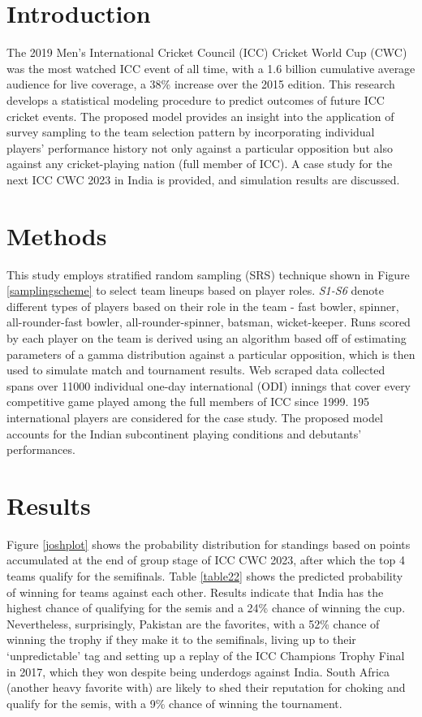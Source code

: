 \documentclass[paper=a4, 12pt, twoside]{article}
\begin{document}
	\section*{Introduction}\label{intro}
		The 2019 Men’s International Cricket Council (ICC) Cricket World Cup (CWC) was the most watched ICC event of all time, with a 1.6 billion cumulative average audience for
		live coverage, a 38\% increase over the 2015 edition. This research develops a statistical
		modeling procedure to predict outcomes of future ICC cricket events. The proposed
		model provides an insight into the application of survey sampling to the team selection
		pattern by incorporating individual players' performance history not only against a
		particular opposition but also against any cricket-playing nation (full member of ICC).
		A case study for the next ICC CWC 2023 in India is provided, and simulation results are
		discussed.  
	\section*{Methods}\label{method}
		This study employs stratified random sampling  (SRS) technique shown in Figure \ref{samplingscheme} to select team lineups based on player roles. \textit{S1-S6} denote different types of players based on their role in the team - fast bowler, spinner, all-rounder-fast bowler, all-rounder-spinner, batsman, wicket-keeper. Runs scored by each player on the team is derived using an algorithm based off of estimating parameters of a gamma distribution against a particular opposition, which is then used to simulate match and tournament results. Web scraped data collected spans over 11000 individual one-day international (ODI) innings that cover every competitive game played among the full members of ICC since 1999. 195 international players are considered for the case study. The proposed model accounts for the Indian subcontinent playing conditions and debutants' performances. 
			\section*{Results}\label{results}
		Figure \ref{joshplot} shows the probability distribution for standings based on points accumulated at the end of group stage of ICC CWC 2023, after which the top 4 teams qualify for the semifinals. Table \ref{table22} shows the predicted probability of winning for teams against each other. Results indicate that India has the highest chance of qualifying for the semis and a 24\% chance of winning the cup. Nevertheless, surprisingly, Pakistan are the favorites, with a 52\% chance of winning the trophy if they make it to the semifinals, living up to their `unpredictable' tag and setting up a replay of the ICC Champions Trophy Final in 2017, which they won despite being underdogs against India. South Africa (another  heavy favorite with) are likely to shed their reputation for choking and qualify for the semis, with a 9\% chance of winning the tournament.   
\end{document}
